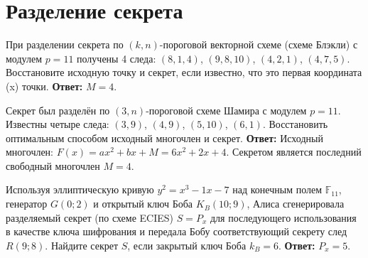 \section{Разделение секрета}
\tasksection

\tasknumber При разделении секрета по $(k, n)$-пороговой векторной схеме (схеме Блэкли) с модулем $p = 11$ получены 4 следа: $\left( {8,1,4} \right)$, $\left( {9,8,10} \right)$, $\left( {4,2,1} \right)$, $\left( {4,7,5} \right)$. Восстановите исходную точку и секрет, если известно, что это первая координата (x) точки.
\medbreak
\textbf{Ответ:} $M = 4$.
\bigbreak

\tasknumber Секрет был разделён по $(3, n)$-пороговой схеме Шамира с модулем $p=11$. Известны четыре следа: $\left( {3,9} \right)$, $\left( {4,9} \right)$, $\left( {5,10} \right)$, $\left( {6,1} \right)$. Восстановить оптимальным способом исходный многочлен и секрет.
\medbreak
\textbf{Ответ:} Исходный многочлен: $F\left( x \right) = ax^2  + bx + M = 6x^2  + 2x + 4$. Секретом является последний свободный многочлен $M = 4$.
\bigbreak

\tasknumber Используя эллиптическую кривую $y^2 = x^3 - 1x - 7$ над конечным полем $\mathbb{F}_{11}$, генератор $G(0; 2)$ и открытый ключ Боба $K_B(10; 9)$, Алиса сгенерировала разделяемый секрет (по схеме ECIES) $S=P_x$ для последующего использования в качестве ключа шифрования и передала Бобу соответствующий секрету след $R(9; 8)$. Найдите секрет $S$, если закрытый ключ Боба $k_B = 6$.
\medbreak
\textbf{Ответ:} $P_x = 5$.
